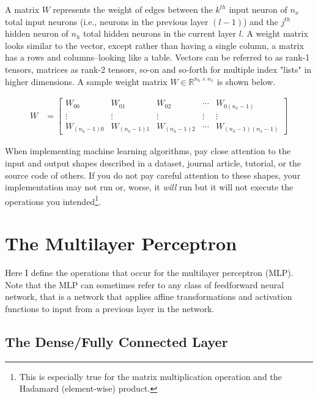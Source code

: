 \documentclass{article}
\begin{document}
A matrix $W$ represents the weight of edges between the $k^{th}$
input neuron of $n_x$ total input neurons (i.e., neurons in the previous layer $(l-1)$)
and the $j^{th}$ hidden neuron of $n_h$ total hidden neurons in the current layer $l$.
A weight matrix looks similar to the vector, except rather than having a single
column, a matrix has a rows and columns--looking like a table. Vectors can
be referred to as rank-1 tensors, matrices as rank-2 tensors, so-on and so-forth
for multiple index "lists" in higher dimensions. A sample weight matrix
$W \in \mathbb{R}^{n_h \times n_x}$ is shown below.

\begin{align}
	W & = \begin{bmatrix}
		W_{00}         & W_{01}         & W_{02}         & \cdots & W_{0(n_{x}-1)}         \\
		\vdots         & \vdots         & \vdots         & \vdots & \vdots                 \\
		W_{(n_{h}-1)0} & W_{(n_{h}-1)1} & W_{(n_{h}-1)2} & \cdots & W_{(n_{h}-1)(n_{x}-1)}
	\end{bmatrix}
\end{align}

When implementing machine learning algorithms, pay close attention to the
input and output shapes described in a dataset, journal article, tutorial, or
the source code of others. If you do not pay careful attention to these shapes,
your implementation may not run or, worse, it \textit{will} run but it will not execute
the operations you intended\footnote{This is especially true for the
	matrix multiplication operation and the Hadamard (element-wise) product.}.

\section{The Multilayer Perceptron}

Here I define the operations that occur for the multilayer perceptron (MLP).
Note that the MLP can sometimes refer to any class of feedforward
neural network, that is a network that applies affine transformations and
activation functions to input from a previous layer in the network.

\subsection{The Dense/Fully Connected Layer}
\end{document}
